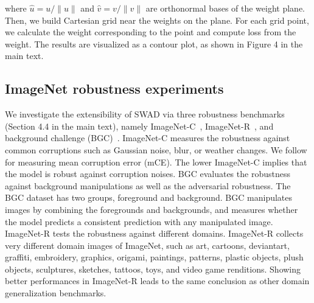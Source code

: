 
where $\hat u=u/\|u\|$ and $\hat v=v/\|v\|$ are orthonormal bases of the weight plane. Then, we build Cartesian grid near the weights on the plane. For each grid point, we calculate the weight corresponding to the point and compute loss from the weight.
The results are visualized as a contour plot, as shown in Figure 4 in the main text.

\subsection{ImageNet robustness experiments}

We investigate the extensibility of SWAD via three robustness benchmarks (Section 4.4 in the main text), namely ImageNet-C~\cite{hendrycks2018benchmarking_robustness_imagenet_c}, ImageNet-R~\cite{hendrycks2020many_face_of_robustness}, and background challenge (BGC)~\cite{xiao2020background_challenge_bgc}. ImageNet-C measures the robustness against common corruptions such as Gaussian noise, blur, or weather changes. We follow \citet{hendrycks2018benchmarking_robustness_imagenet_c} for measuring mean corruption error (mCE). The lower ImageNet-C implies that the model is robust against corruption noises.
BGC evaluates the robustness against background manipulations as well as the adversarial robustness. The BGC dataset has two groups, foreground and background. BGC manipulates images by combining the foregrounds and backgrounds, and measures whether the model predicts a consistent prediction with any manipulated image.
ImageNet-R tests the robustness against different domains. ImageNet-R collects very different domain images of ImageNet, such as art, cartoons, deviantart, graffiti, embroidery, graphics, origami, paintings, patterns, plastic objects, plush objects, sculptures, sketches, tattoos, toys, and video game renditions. Showing better performances in ImageNet-R leads to the same conclusion as other domain generalization benchmarks.


